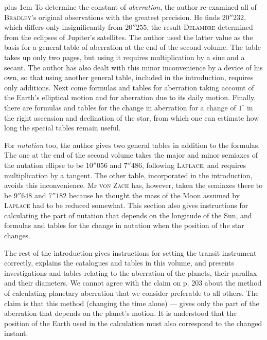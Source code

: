\begingroup\rightskip=0pt plus 1em
To determine the constant of \emph{aberration}, the author re-examined all of \textsc{Bradley}’s original
observations with the greatest precision. He finds $20''232$, which differs only insignificantly from $20''255$, the result \textsc{Delambre} determined from the eclipses of Jupiter’s satellites. The author used the latter value as the basis for a general table of aberration at the end of the second volume. The table takes up only two pages, but using it requires multiplication by a sine and a secant. The author has also dealt with this minor inconvenience by a device of his own, so that using another general table, included in the introduction, requires only additions. Next come formulas and tables for aberration taking account of the Earth’s elliptical motion and for aberration due to its daily motion. Finally, there are formulas and tables for the change in aberration for a change of $1^\circ$ in the right ascension and declination of the star, from which one can estimate how long the special tables remain useful.\par\endgroup

For \emph{nutation} too, the author gives two general tables in addition to the formulas. The one at the end of the second volume takes the major and minor semiaxes of the nutation ellipse to be $10''056$ and $7''486$, following \textsc{Laplace}, and requires multiplication by a tangent. The other table, incorporated in the introduction, avoids this inconvenience. Mr \textsc{von Zach} has, however, taken the semiaxes there to be $9''648$ and $7''182$ because he thought the mass of the Moon assumed by \textsc{Laplace} had to be reduced somewhat. This section also gives instructions for calculating the part of nutation that depends on the longitude of the Sun, and formulas and tables for the change in nutation when the position of the star changes.

The rest of the introduction gives instructions for setting the transit instrument correctly, explains the catalogues and tables in this volume, and presents investigations and tables relating to the aberration of the planets, their parallax and their diameters. We cannot agree with the claim on p. 203 about the method of calculating planetary aberration that we consider preferable to all others. The claim is that this method (changing the time alone) --- gives only the part of the aberration that depends on the planet’s motion. It is understood that the position of the Earth used in the calculation must also correspond to the changed instant.

